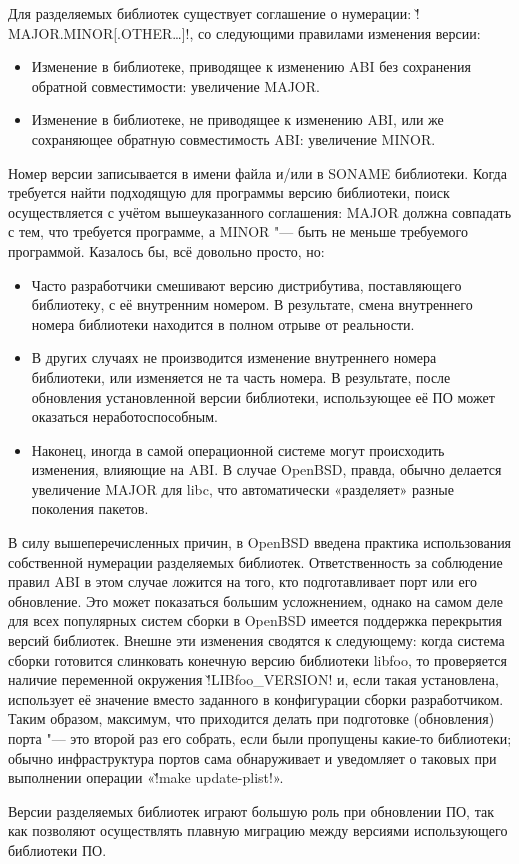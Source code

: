 \documentclass[10pt, a5paper]{article}
\begin{document}
Для разделяемых библиотек существует соглашение о нумерации: \v!MAJOR.MINOR[.OTHER\ldots{}]!, со следующими правилами изменения версии:

\begin{itemize}
  \item Изменение в библиотеке, приводящее к изменению ABI без сохранения обратной совместимости: увеличение MAJOR.
  \item Изменение в библиотеке, не приводящее к изменению ABI, или же сохраняющее обратную совместимость ABI: увеличение MINOR.
\end{itemize}

Номер версии записывается в имени файла и/или в SONAME библиотеки. Когда требуется найти подходящую для программы версию библиотеки, поиск осуществляется с учётом вышеуказанного соглашения: MAJOR должна совпадать с тем, что требуется программе, а MINOR "--- быть не меньше требуемого программой. Казалось бы, всё довольно просто, но:

\begin{itemize}
  \item Часто разработчики смешивают версию дистрибутива, поставляющего библиотеку, с её внутренним номером. В результате, смена внутреннего номера библиотеки находится в полном отрыве от реальности.
  \item В других случаях не производится изменение внутреннего номера библиотеки, или изменяется не та часть номера. В результате, после обновления установленной версии библиотеки, использующее её ПО может оказаться неработоспособным.
  \item Наконец, иногда в самой операционной системе могут происходить изменения, влияющие на ABI. В случае OpenBSD, правда, обычно делается увеличение MAJOR для libc, что автоматически «разделяет» разные поколения пакетов.
\end{itemize}

В силу вышеперечисленных причин, в OpenBSD введена практика использования собственной нумерации разделяемых библиотек. Ответственность за соблюдение правил ABI в этом случае ложится на того, кто подготавливает порт или его обновление. Это может показаться большим усложнением, однако на самом деле для всех популярных систем сборки в OpenBSD имеется поддержка перекрытия версий библиотек. Внешне эти изменения сводятся к следующему: когда система сборки готовится слинковать конечную версию библиотеки libfoo, то проверяется наличие переменной окружения \v!LIBfoo\_VERSION! и, если такая установлена, использует её значение вместо заданного в конфигурации сборки разработчиком. Таким образом, максимум, что приходится делать при подготовке (обновления) порта "--- это второй раз его собрать, если были пропущены какие-то библиотеки; обычно инфраструктура портов сама обнаруживает и уведомляет о таковых при выполнении операции «\v!make update-plist!».

Версии разделяемых библиотек играют большую роль при обновлении ПО, так как позволяют осуществлять плавную миграцию между версиями использующего библиотеки ПО.
\end{document}
